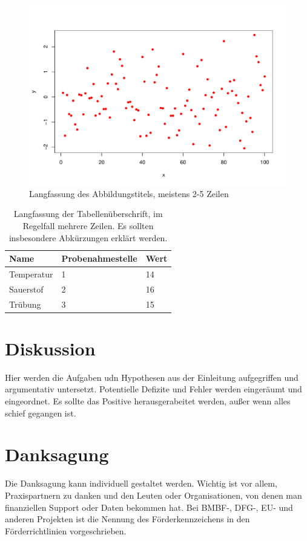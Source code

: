 \documentclass[english,ngerman,BCOR=6mm,cdgeometry=no,DIV=13]{tudscrreprt}
\begin{document}
\begin{figure}
	\centering
	\includegraphics[width=\textwidth]{pdf-plot.pdf}
	\caption[Kurzfassung des Abbildungstitels]{Langfassung des Abbildungstitels,
	         meistens 2-5 Zeilen}\label{fig:fig_1}
\end{figure}

\begin{table}
	\centering
	\caption[Kurzfassung der Tabellenüberschrft]{Langfassung der Tabellenüberschrift,
	        im Regelfall mehrere Zeilen. Es sollten insbesondere Abkürzungen erklärt werden.}
	\label{tab:my_label}
	\begin{tabular}{lll}\hline
		Name & Probenahmestelle & Wert\\\hline
		Temperatur & 1  & 14  \\
		Sauerstof & 2  & 16 \\
		Trübung & 3 & 15 \\ \hline
	\end{tabular}
\end{table}

\chapter{Diskussion}

Hier werden die Aufgaben udn Hypothesen aus der Einleitung aufgegriffen und
argumentativ untersetzt. Potentielle Defizite und Fehler werden eingeräumt und
eingeordnet. Es sollte das Positive herausgerabeitet werden, außer wenn alles
schief gegangen ist.

\chapter{Danksagung}

Die Danksagung kann individuell gestaltet werden. Wichtig ist vor allem,
Praxispartnern zu danken und den Leuten oder Organisationen, von denen man
finanziellen Support oder Daten bekommen hat. Bei BMBF-, DFG-, EU- und anderen
Projekten ist die Nennung des Förderkennzeichens in den Förderrichtlinien
vorgeschrieben.


\printbibliography
\end{document}
